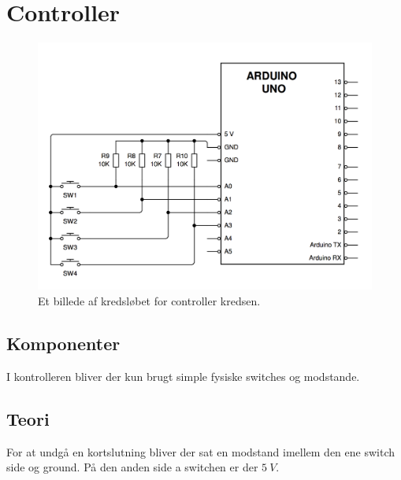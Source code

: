 \section{Controller}
\begin{figure}[H]	
	\centering
    \includegraphics[width=13cm]{figures/CIRCUITS/controllerFinal.png}
	\caption{Et billede af kredsløbet for controller kredsen.}
	\label{kreds:controller}
\end{figure}

\subsection{Komponenter}
I kontrolleren bliver der kun brugt simple fysiske switches og modstande.

\subsection{Teori}
For at undgå en kortslutning bliver der sat en modstand imellem den ene switch side og ground. På den anden side a switchen er der $\SI{5}{V}$.


